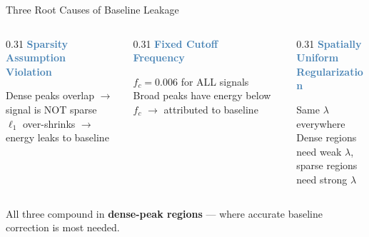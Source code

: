 \documentclass[aspectratio=169, 10pt]{beamer}
\begin{document}
\begin{frame}{Three Root Causes of Baseline Leakage}
\begin{columns}[T]
\begin{column}{0.31\textwidth}
\centering
\textcolor{steelblue}{\textbf{Sparsity Assumption\\Violation}}

\vspace{0.5em}
{\small
Dense peaks overlap $\rightarrow$ signal is NOT sparse\\[0.3em]
$\ell_1$ over-shrinks $\rightarrow$ energy leaks to baseline
}
\end{column}

\begin{column}{0.31\textwidth}
\centering
\textcolor{steelblue}{\textbf{Fixed Cutoff\\Frequency}}

\vspace{0.5em}
{\small
$f_c = 0.006$ for ALL signals\\[0.3em]
Broad peaks have energy below $f_c$ $\rightarrow$ attributed to baseline
}
\end{column}

\begin{column}{0.31\textwidth}
\centering
\textcolor{steelblue}{\textbf{Spatially Uniform\\Regularization}}

\vspace{0.5em}
{\small
Same $\lambda$ everywhere\\[0.3em]
Dense regions need weak $\lambda$,\\ sparse regions need strong $\lambda$
}
\end{column}
\end{columns}

\vspace{1em}
\begin{resultbad}
\centering
All three compound in \textbf{dense-peak regions} --- where accurate baseline correction is most needed.
\end{resultbad}
\end{frame}
\end{document}
